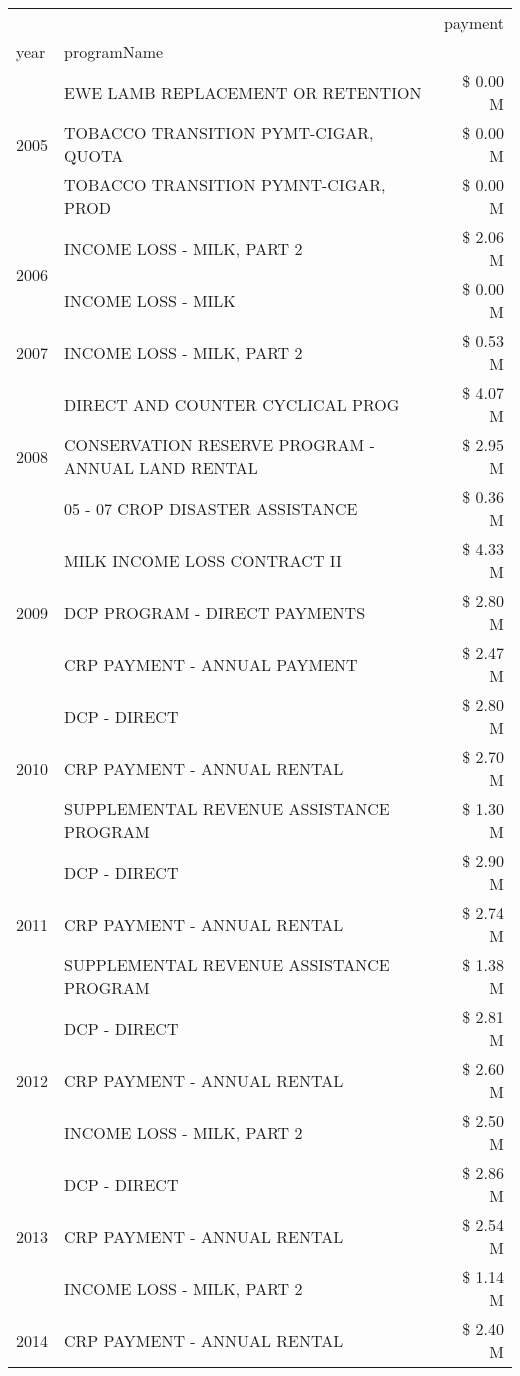 \begin{tabular}{llr}
\toprule
 &  & payment \\
year & programName &  \\
\midrule
\multirow[t]{3}{*}{2005} & EWE LAMB REPLACEMENT OR RETENTION & \$ 0.00 M \\
 & TOBACCO TRANSITION PYMT-CIGAR, QUOTA & \$ 0.00 M \\
 & TOBACCO TRANSITION PYMNT-CIGAR, PROD & \$ 0.00 M \\
\cline{1-3}
\multirow[t]{2}{*}{2006} & INCOME LOSS - MILK, PART 2 & \$ 2.06 M \\
 & INCOME LOSS - MILK & \$ 0.00 M \\
\cline{1-3}
2007 & INCOME LOSS - MILK, PART 2 & \$ 0.53 M \\
\cline{1-3}
\multirow[t]{3}{*}{2008} & DIRECT AND COUNTER CYCLICAL PROG & \$ 4.07 M \\
 & CONSERVATION RESERVE PROGRAM - ANNUAL LAND RENTAL & \$ 2.95 M \\
 & 05 - 07 CROP DISASTER ASSISTANCE & \$ 0.36 M \\
\cline{1-3}
\multirow[t]{3}{*}{2009} & MILK INCOME LOSS CONTRACT II & \$ 4.33 M \\
 & DCP PROGRAM - DIRECT PAYMENTS & \$ 2.80 M \\
 & CRP PAYMENT - ANNUAL PAYMENT & \$ 2.47 M \\
\cline{1-3}
\multirow[t]{3}{*}{2010} & DCP - DIRECT & \$ 2.80 M \\
 & CRP PAYMENT - ANNUAL RENTAL & \$ 2.70 M \\
 & SUPPLEMENTAL REVENUE ASSISTANCE PROGRAM & \$ 1.30 M \\
\cline{1-3}
\multirow[t]{3}{*}{2011} & DCP - DIRECT & \$ 2.90 M \\
 & CRP PAYMENT - ANNUAL RENTAL & \$ 2.74 M \\
 & SUPPLEMENTAL REVENUE ASSISTANCE PROGRAM & \$ 1.38 M \\
\cline{1-3}
\multirow[t]{3}{*}{2012} & DCP - DIRECT & \$ 2.81 M \\
 & CRP PAYMENT - ANNUAL RENTAL & \$ 2.60 M \\
 & INCOME LOSS - MILK, PART 2 & \$ 2.50 M \\
\cline{1-3}
\multirow[t]{3}{*}{2013} & DCP - DIRECT & \$ 2.86 M \\
 & CRP PAYMENT - ANNUAL RENTAL & \$ 2.54 M \\
 & INCOME LOSS - MILK, PART 2 & \$ 1.14 M \\
\cline{1-3}
\multirow[t]{3}{*}{2014} & CRP PAYMENT - ANNUAL RENTAL & \$ 2.40 M \\

\end{tabular}
